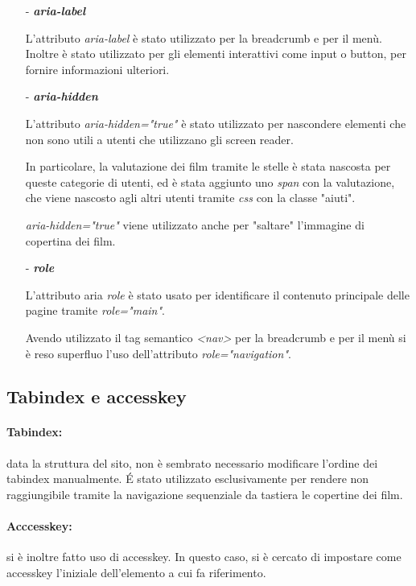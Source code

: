 \documentclass[a4paper]{article}
\begin{document}
\begin{itemize}
    \item [-] \textit{\textbf{aria-label}}
    
    L'attributo \textit{aria-label} è stato utilizzato per la breadcrumb e per il menù.
    Inoltre è stato utilizzato per gli elementi interattivi come input o button, per fornire informazioni ulteriori.

    \item [-] \textit{\textbf{aria-hidden}}
    
    L'attributo \textit{aria-hidden="true"} è stato utilizzato per nascondere elementi che non sono utili a utenti che utilizzano gli screen reader.

    In particolare, la valutazione dei film tramite le stelle è stata nascosta per queste categorie di utenti, ed è stata aggiunto uno \textit{span} con la valutazione, che viene nascosto agli altri utenti tramite \textit{css} con la classe "aiuti".

    \textit{aria-hidden="true"} viene utilizzato anche per "saltare" l'immagine di copertina dei film.

    \item [-] \textit{\textbf{role}}
    
    L'attributo aria \textit{role} è stato usato per identificare il contenuto principale delle pagine tramite \textit{role="main"}.
    
    Avendo utilizzato il tag semantico \textit{<nav>} per la breadcrumb e per il menù si è reso superfluo l'uso dell'attributo \textit{role="navigation"}.

\end{itemize}

\subsection{Tabindex e accesskey}

\paragraph*{Tabindex:}
data la struttura del sito, non è sembrato necessario modificare l’ordine dei tabindex manualmente.
É stato utilizzato esclusivamente per rendere non raggiungibile tramite la navigazione sequenziale da tastiera le copertine dei film.

\paragraph*{Acccesskey:}
si è inoltre fatto uso di accesskey. In questo caso, si è cercato di impostare come accesskey l'iniziale dell'elemento a cui fa riferimento.
\end{document}
